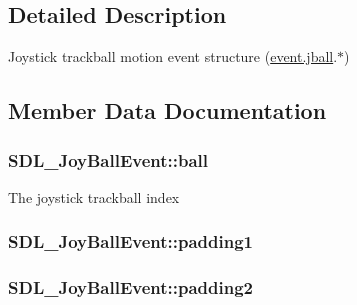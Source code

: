 \subsection{Detailed Description}
Joystick trackball motion event structure (\hyperlink{union_s_d_l___event_ae433f511e3383d17f8fe02df745ee8f8}{event.\+jball}.$\ast$) 

\subsection{Member Data Documentation}
\subsubsection[{\texorpdfstring{ball}{ball}}]{ S\+D\+L\+\_\+\+Joy\+Ball\+Event\+::ball}\hypertarget{struct_s_d_l___joy_ball_event_add4eb0daeaf95ae56e8c7cfcec560242}{}\label{struct_s_d_l___joy_ball_event_add4eb0daeaf95ae56e8c7cfcec560242}
The joystick trackball index 
\subsubsection[{\texorpdfstring{padding1}{padding1}}]{ S\+D\+L\+\_\+\+Joy\+Ball\+Event\+::padding1}\hypertarget{struct_s_d_l___joy_ball_event_aff75a6519ca2a19cffdc14ebf4626613}{}\label{struct_s_d_l___joy_ball_event_aff75a6519ca2a19cffdc14ebf4626613}
\subsubsection[{\texorpdfstring{padding2}{padding2}}]{ S\+D\+L\+\_\+\+Joy\+Ball\+Event\+::padding2}\hypertarget{struct_s_d_l___joy_ball_event_a0ea3071b99ac096b0157714f01ff04f8}{}\label{struct_s_d_l___joy_ball_event_a0ea3071b99ac096b0157714f01ff04f8}
